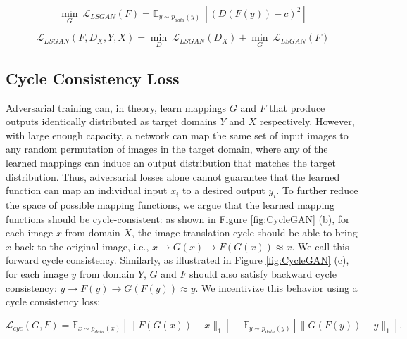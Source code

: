     \begin{equation}\label{lsgan5}        
        \underset{G}{\min}\ \mathcal{L}_{LSGAN}(F) = \mathbb{E}_{y \sim p_{data}(y)}\ [(D(F(y)) - c)^2]
    \end{equation}
    
    
    \begin{equation}\label{lsgan6}        
        \mathcal{L}_{LSGAN}(F, D_X, Y, X) = \underset{D}{\min}\ \mathcal{L}_{LSGAN}(D_X) + \underset{G}{\min}\ \mathcal{L}_{LSGAN}(F)
    \end{equation}
    






\subsection{Cycle Consistency Loss}\label{CycleConsistencyLoss}

Adversarial training can, in theory, learn mappings $G$ and $F$ that produce outputs identically distributed as target domains $Y$ and $X$ respectively. However, with large enough capacity, a network can map the same set of input images to any random permutation of images in the target domain, where any of the learned mappings can induce an output distribution that matches the target distribution. Thus, adversarial losses alone cannot guarantee that the learned function can map an individual input $x_i$ to a desired output $y_i$. To further reduce the space of possible mapping functions, we argue that the learned mapping functions should be cycle-consistent: as shown in Figure \ref{fig:CycleGAN} (b), for each image $x$ from domain $X$, the image translation cycle should be able to bring $x$ back to the original image, i.e., $x \rightarrow G(x) \rightarrow F(G(x)) \approx x$. We call this forward cycle consistency. Similarly, as illustrated in Figure \ref{fig:CycleGAN} (c), for each image $y$ from domain $Y$, $G$ and $F$ should also satisfy backward cycle consistency: $y \rightarrow F(y) \rightarrow G(F(y)) \approx y$. We incentivize this behavior using a cycle consistency loss: 

\begin{equation}\label{CycleConsistencyLossEquation}
    \mathcal{L}_{cyc}(G, F) = \mathbb{E}_{x \sim p_{data}(x)}[\|F(G(x)) - x\|_1] + \mathbb{E}_{y \sim p_{data}(y)}[\|G(F(y)) - y\|_1].
    \end{equation}

